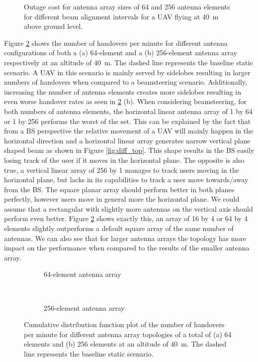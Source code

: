 \documentclass[conference,twocolumn]{IEEEtran}
\begin{document}
\begin{figure}[tbp]
\centering

\caption{Outage cost for antenna array sizes of 64 and 256 antenna elements for different beam alignment intervals for a UAV flying at $40$~m above ground level.}
\label{fig:outage}
\end{figure}
\par Figure \ref{fig:handovers40} shows the number of handovers per minute for different antenna configurations of both a (a) 64-element and a (b) 256-element antenna array respectively at an altitude of $40$~m. The dashed line represents the baseline static scenario. A UAV in this scenario is mainly served by sidelobes resulting in larger numbers of handovers when compared to a beamsteering scenario. Additionally, increasing the number of antenna elements creates more sidelobes resulting in even worse handover rates as seen in \ref{fig:handovers40} (b). When considering beamsteering, for both numbers of antenna elements, the horizontal linear antenna array of 1 by 64 or 1 by 256 performs the worst of the set. This can be explained by the fact that from a BS perspective the relative movement of a UAV will mainly happen in the horizontal direction and a horizontal linear array generates narrow vertical plane shaped beam as shown in Figure \ref{fig:diff_top}. This shape results in the BS easily losing track of the user if it moves in the horizontal plane. The opposite is also true, a vertical linear array of 256 by 1 manages to track users moving in the horizontal plane, but lacks in its capabilities to track a user move towards/away from the BS. The square planar array should perform better in both planes perfectly, however users move in general more the horizontal plane. We could assume that a rectangular with slightly more antennas on the vertical axis should perform even better. Figure \ref{fig:handovers40} shows exactly this, an array of 16 by 4 or 64 by 4 elements slightly outperforms a default square array of the same number of antennas. We can also see that for larger antenna arrays the topology has more impact on the performance when compared to the results of the smaller antenna array.

\begin{figure}[t]
\centering
\begin{subfigure}[t]{\linewidth}
\caption{64-element antenna array}

\end{subfigure}\\
\begin{subfigure}[t]{\linewidth}
\caption{256-element antenna array}

\end{subfigure}
\caption{Cumulative distribution function plot of the number of handovers per minute for different antenna array topologies of a total of (a) 64 elements and (b) 256 elements at an altitude of $40$~m. The dashed line represents the baseline static scenario.}
\label{fig:handovers40}
\end{figure}
\end{document}
